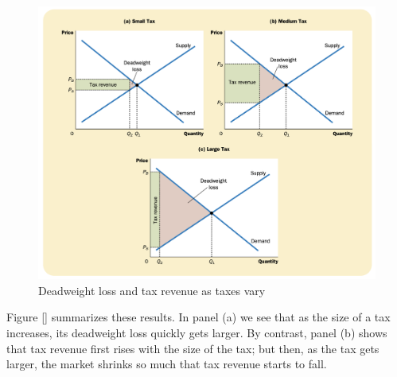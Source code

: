 \begin{figure}[!ht]
  \centering
  \includegraphics[width=\textwidth]{pics/taxes-vary}
  \caption[Taxes vary]{Deadweight loss and tax revenue as taxes vary}
  \label{fig:taxes-vary}
\end{figure}

Figure \ref{} summarizes these results.
In panel (a) we see that as the size of a tax increases, its deadweight loss quickly gets larger.
By contrast, panel (b) shows that tax revenue first rises with the size of the tax; but then, as the tax gets larger, the market shrinks so much that tax revenue starts to fall.

